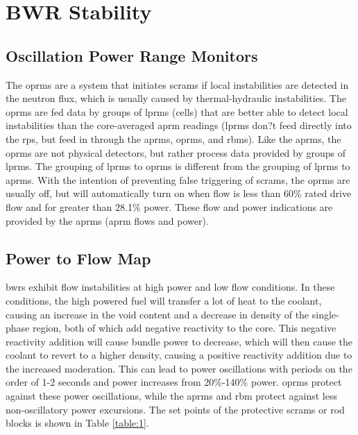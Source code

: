 \documentclass[10pt]{article}
\begin{document}
\tableofcontents
\clearpage

\section{BWR Stability}

\subsection{Oscillation Power Range Monitors}
The \gls{oprm}s are a system that initiates scrams if local instabilities are detected in the neutron flux, which is usually caused by thermal-hydraulic instabilities. The \gls{oprm}s are fed data by groups of \gls{lprm}s (cells) that are better able to detect local instabilities than the core-averaged \gls{aprm} readings (\gls{lprm}s don?t feed directly into the \gls{rps}, but feed in through the \gls{aprm}s, \gls{oprm}s, and \gls{rbm}s). Like the \gls{aprm}s, the \gls{oprm}s are not physical detectors, but rather process data provided by groups of \gls{lprm}s. The grouping of \gls{lprm}s to \gls{oprm}s is different from the grouping of \gls{lprm}s to \gls{aprm}s. With the intention of preventing false triggering of scrams, the \gls{oprm}s are usually off, but will automatically turn on when flow is less than 60\% rated drive flow and for greater than 28.1\% power. These flow and power indications are provided by the \gls{aprm}s (\gls{aprm} flows and power). 
\subsection{Power to Flow Map}
\gls{bwr}s exhibit flow instabilities at high power and low flow conditions. In these conditions, the high powered fuel will transfer a lot of heat to the coolant, causing an increase in the void content and a decrease in density of the single-phase region, both of which add negative reactivity to the core. This negative reactivity addition will cause bundle power to decrease, which will then cause the coolant to revert to a higher density, causing a positive reactivity addition due to the increased moderation. This can lead to power oscillations with periods on the order of 1-2 seconds and power increases from 20\%-140\% power. \gls{oprm}s protect against these power oscillations, while the \gls{aprm}s and \gls{rbm} protect against less non-oscillatory power excursions. The set points of the protective scrams or rod blocks is shown in Table \ref{table:1}.
\end{document}
